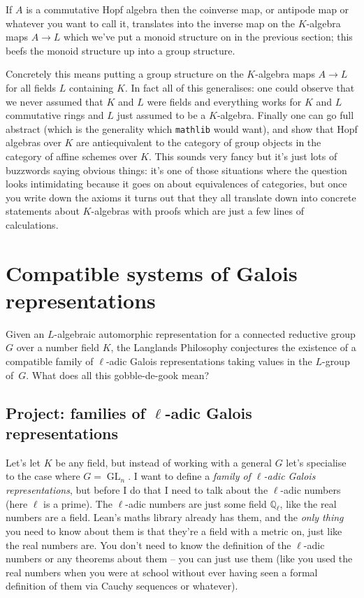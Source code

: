 \documentclass{amsart}
\newcommand{\Q}{\mathbb{Q}}
\DeclareMathOperator{\GL}{GL}
\begin{document}
If $A$ is a commutative Hopf algebra then the coinverse map, or antipode map or whatever you want to call it, translates into the inverse map on the $K$-algebra maps $A\to L$ which we've put a monoid structure on in the previous section; this beefs the monoid structure up into a group structure.

Concretely this means putting a group structure on the $K$-algebra maps $A\to L$ for all fields $L$ containing $K$. In fact all of this generalises: one could observe that we never assumed that $K$ and $L$ were fields and everything works for $K$ and $L$ commutative rings and $L$ just assumed to be a $K$-algebra. Finally one can go full abstract (which is the generality which {\tt mathlib} would want), and show that Hopf algebras over $K$ are antiequivalent to the category of group objects in the category of affine schemes over $K$. This sounds very fancy but it's just lots of buzzwords saying obvious things: it's one of those situations where the question looks intimidating because it goes on about equivalences of categories, but once you write down the axioms it turns out that they all translate down into concrete statements about $K$-algebras with proofs which are just a few lines of calculations.

\section{Compatible systems of Galois representations}

Given an $L$-algebraic automorphic representation for a connected reductive group $G$ over a number field $K$, the Langlands Philosophy conjectures the existence of a compatible family of $\ell$-adic Galois representations taking values in the $L$-group of~$G$. What does all this gobble-de-gook mean?

\subsection{Project: families of $\ell$-adic Galois representations}

Let's let $K$ be any field, but instead of working with a general $G$ let's specialise to the case where $G=\GL_n$. I want to define a \emph{family of $\ell$-adic Galois representations}, but before I do that I need to talk about the $\ell$-adic numbers (here $\ell$ is a prime). The $\ell$-adic numbers are just some field $\Q_\ell$, like the real numbers are a field. Lean's maths library already has them, and the \emph{only thing} you need to know about them is that they're a field with a metric on, just like the real numbers are. You don't need to know the definition of the $\ell$-adic numbers or any theorems about them -- you can just use them (like you used the real numbers when you were at school without ever having seen a formal definition of them via Cauchy sequences or whatever). 
\end{document}
